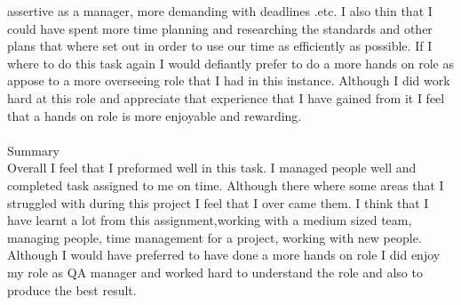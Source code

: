 \documentclass{project}
\begin{document}
assertive as a manager, more demanding with deadlines .etc. I also thin that I could have
spent more time planning and researching the standards and other plans that where set
out in order to use our time as efficiently as possible. If I where to do this task again I
would defiantly prefer to do a more hands on role as appose to a more overseeing role
that I had in this instance. Although I did work hard at this role and appreciate that
experience that I have gained from it I feel that a hands on role is more enjoyable and
rewarding.
\\\\
Summary\\
Overall I feel that I preformed well in this task. I managed people well and completed task
assigned to me on time. Although there where some areas that I struggled with during this
project I feel that I over came them. I think that I have learnt a lot from this assignment,working with a medium sized team, managing people, time management for a project,
working with new people. Although I would have preferred to have done a more hands on
role I did enjoy my role as QA manager and worked hard to understand the role and also
to produce the best result.
\\\\
\end{document}
